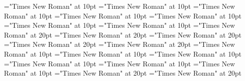 \documentclass[a4paper]{article}
\begin{document}
 
\pagestyle{plain} 
\font\examplelastoftypearticledictionary="Times New Roman" at 10pt
\font\exampleuselastoftypearticledictionary="Times New Roman" at 10pt
\font\examplefirstoftypearticledictionary="Times New Roman" at 10pt
\font\exampleusefirstoftypearticledictionary="Times New Roman" at 10pt
\font\firstoftypelastoftypenotearticledictionary="Times New Roman" at 10pt
\font{}="Times New Roman" at 10pt
\font\firstoftypegrammarcategorylastoftypearticledictionary="Times New Roman" at 10pt
\font\lastoftypepronunciationenUKarticledictionary="Times New Roman" at 20pt
\font\pronunciationenUSpronunciationbeforearticledictionary="Times New Roman" at 20pt
\font\lastoftypepronunciationenUSarticledictionary="Times New Roman" at 20pt
\font\pronunciationenUKpronunciationbeforearticledictionary="Times New Roman" at 20pt
\font\firstoftypepronunciationenUKarticledictionary="Times New Roman" at 20pt
\font\firstoftypelastoftyperelationsynonymarticledictionary="Times New Roman" at 10pt
\font\firstoftypegrammarrequireslastoftypearticledictionary="Times New Roman" at 10pt
\font\firstoftypeheadwordlastoftypearticledictionary="Times New Roman" at 10pt
\font\articledictionary="Times New Roman" at 10pt
\font\headsectionletterdictionary="Times New Roman" at 10pt
\font\sectionletterdictionary="Times New Roman" at 10pt
\font\pronunciationenUSpronunciationbefore="Times New Roman" at 20pt
\font\pronunciationenUKpronunciationbefore="Times New Roman" at 20pt

\pagestyle{fancy} 


\end{document}
